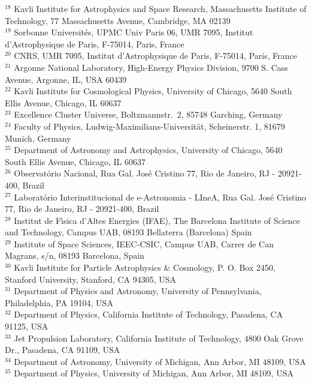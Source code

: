 \documentclass[useAMS,usenatbib,iop,numberedappendix]{mn2e}
\begin{document}
$^{18}$ Kavli Institute for Astrophysics and Space Research, Massachusetts Institute of Technology, 77 Massachusetts Avenue, Cambridge, MA 02139\\
$^{19}$ Sorbonne Universit\'es, UPMC Univ Paris 06, UMR 7095, Institut d'Astrophysique de Paris, F-75014, Paris, France\\
$^{20}$ CNRS, UMR 7095, Institut d'Astrophysique de Paris, F-75014, Paris, France\\
$^{21}$ Argonne National Laboratory, High-Energy Physics Division, 9700 S. Cass Avenue, Argonne, IL, USA 60439\\
$^{22}$ Kavli Institute for Cosmological Physics, University of Chicago, 5640 South Ellis Avenue, Chicago, IL 60637\\
$^{23}$ Excellence Cluster Universe, Boltzmannstr.\ 2, 85748 Garching, Germany\\
$^{24}$ Faculty of Physics, Ludwig-Maximilians-Universit\"at, Scheinerstr. 1, 81679 Munich, Germany\\
$^{25}$ Department of Astronomy and Astrophysics, University of Chicago, 5640 South Ellis Avenue, Chicago, IL 60637\\
$^{26}$ Observat\'orio Nacional, Rua Gal. Jos\'e Cristino 77, Rio de Janeiro, RJ - 20921-400, Brazil\\
$^{27}$ Laborat\'orio Interinstitucional de e-Astronomia - LIneA, Rua Gal. Jos\'e Cristino 77, Rio de Janeiro, RJ - 20921-400, Brazil\\
$^{28}$ Institut de F\'{\i}sica d'Altes Energies (IFAE), The Barcelona Institute of Science and Technology, Campus UAB, 08193 Bellaterra (Barcelona) Spain\\
$^{29}$ Institute of Space Sciences, IEEC-CSIC, Campus UAB, Carrer de Can Magrans, s/n,  08193 Barcelona, Spain\\
$^{30}$ Kavli Institute for Particle Astrophysics \& Cosmology, P. O. Box 2450, Stanford University, Stanford, CA 94305, USA\\
$^{31}$ Department of Physics and Astronomy, University of Pennsylvania, Philadelphia, PA 19104, USA\\
$^{32}$ Department of Physics, California Institute of Technology, Pasadena, CA 91125, USA\\
$^{33}$ Jet Propulsion Laboratory, California Institute of Technology, 4800 Oak Grove Dr., Pasadena, CA 91109, USA\\
$^{34}$ Department of Astronomy, University of Michigan, Ann Arbor, MI 48109, USA\\
$^{35}$ Department of Physics, University of Michigan, Ann Arbor, MI 48109, USA\\
\end{document}
